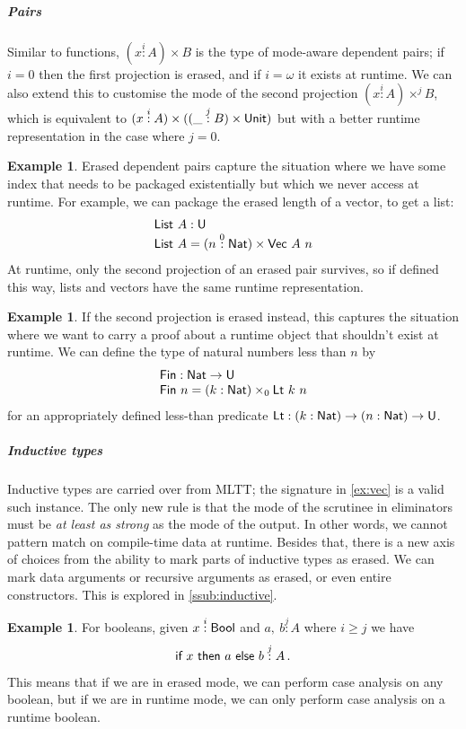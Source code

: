 \documentclass[10pt,a4paper]{article}
\theoremstyle{definition}
\newtheorem{example}[theorem]{Example}
\theoremstyle{remark}
\newcommand{\s}[1]{{\ensuremath{\textsf{\upshape #1}}}\xspace}
\newcommand{\col}[1]{\stackrel{#1}{:}}
\begin{document}
\subparagraph{Pairs}\label{ssub:dep-pairs} Similar to functions, $(x \col{i} A)
\times B$ is the type of mode-aware dependent pairs; if $i = 0$ then the
first projection is erased, and if $i = \omega$ it exists at runtime.  We can also extend this to customise the mode of
the second projection $(x \col{i} A) \times^{j} B$, which is equivalent to $(x
\col{i} A) \times ((\_ \col{j} B) \times \s{Unit})$ but with a better
runtime representation in the case where $j = 0$.

\begin{example}
Erased dependent pairs capture the situation where we have some index that needs
to be packaged existentially but which we never access at runtime. For example, we can
package the erased length of a vector, to get a list:
\[\begin{array}{l}
  \s{List}\ A: \s{U} \\
  \s{List}\ A = (n \col{0} \s{Nat}) \times \s{Vec}\ A\ n \end{array} \] At
runtime, only the second projection of an erased pair survives, so if defined
this way, lists and vectors have the same runtime representation.
\end{example}

\begin{example}
If the second projection is erased instead, this captures the situation where
we want to carry a proof about a runtime object that shouldn't exist at runtime.
We can define the type of natural numbers less than $n$ by
\[\begin{array}{l}
\s{Fin} : \s{Nat} \to \s{U} \\
\s{Fin}\ n = (k : \s{Nat}) \times_0 \s{Lt}\ k\ n \end{array} \] for an
appropriately defined less-than predicate $\s{Lt} : (k : \s{Nat}) \to (n :
\s{Nat}) \to \s{U}$.
\end{example}

\subparagraph{Inductive types}
Inductive types are carried over from MLTT; the signature in \cref{ex:vec} is a
valid such instance. The only new rule is that the mode of the scrutinee in
eliminators must be \emph{at least as strong} as the mode of the output. In
other words, we cannot pattern match on compile-time data at runtime. Besides
that, there is a new axis of choices from the ability to mark parts of inductive
types as erased. We can mark data arguments or recursive arguments as erased, or
even entire constructors. This is explored in \cref{ssub:inductive}.

\begin{example}
For booleans, given $x \col{i} \s{Bool}$ and $a,\ b \col{j} A$ where
$i \geq j$ we have
\[
  \s{if}\ x\ \s{then}\ a\ \s{else}\ b \col{j} A \,.
\]
This means that if we are in erased mode, we can perform
case analysis on any boolean, but if we are in runtime mode, we
can only perform case analysis on a runtime boolean.
\end{example}
\end{document}

